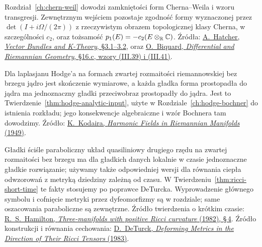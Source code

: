 \begin{description}[leftmargin=2.9cm,style=nextline]
\item[Normalizacja topologiczna Cherna--Weila.]
  Rozdział~\ref{ch:chern-weil} dowodzi zamkniętości
  form Cherna--Weila i wzoru transgresji. Zewnętrznym
  wejściem pozostaje zgodność formy wyznaczonej przez
  $\det(I+i\Omega/(2\pi))$ z rzeczywistym obrazem
  topologicznej klasy Cherna, w szczególności $c_2$,
  oraz tożsamość $p_1(E)=-c_2(E\otimes_{\mathbb{R}}\mathbb{C})$.
  Źródła:
  \href{https://pi.math.cornell.edu/~hatcher/VBKT/VB.pdf}
  {A.\ Hatcher, \emph{Vector Bundles and K-Theory},
  §3.1--3.2}, oraz
  \href{https://webusers.imj-prg.fr/~olivier.biquard/m2dg2022.pdf}
  {O.\ Biquard, \emph{Differential and Riemannian Geometry},
  §16.c, wzory (III.39) i (III.41)}.

\item[Analityczna teoria Hodge'a.]
  Dla laplasjanu Hodge'a na formach zwartej
  rozmaitości riemannowskiej bez brzegu
  jądro jest skończenie wymiarowe, a każda
  gładka forma prostopadła do jądra ma
  jednoznaczny gładki przeciwobraz
  prostopadły do jądra. Jest to
  Twierdzenie~\ref{thm:hodge-analytic-input},
  użyte w Rozdziale~\ref{ch:hodge-bochner}
  do istnienia rozkładu; jego konsekwencje
  algebraiczne i wzór Bochnera tam dowodzimy.
  Źródło:
  \href{https://doi.org/10.2307/1969552}
  {K.\ Kodaira, \emph{Harmonic Fields in
  Riemannian Manifolds} (1949)}.

\item[Analityczna teoria potoku Ricciego.]
  Gładki ściśle paraboliczny układ
  quasiliniowy drugiego rzędu na zwartej
  rozmaitości bez brzegu ma dla gładkich
  danych lokalnie w czasie jednoznaczne
  gładkie rozwiązanie; używamy także
  odpowiedniej wersji dla równania ciepła
  odwzorowań z metryką dziedziny zależną
  od czasu. W
  Twierdzeniu~\ref{thm:ricci-short-time}
  te fakty stosujemy po poprawce DeTurcka.
  Wyprowadzenie głównego symbolu i cofnięcie
  metryki przez dyfeomorfizmy są w rozdziale;
  same oszacowania paraboliczne są zewnętrzne.
  Źródło twierdzenia o krótkim czasie:
  \href{https://projecteuclid.org/journals/journal-of-differential-geometry/volume-17/issue-2/Three-manifolds-with-positive-Ricci-curvature/10.4310/jdg/1214436922.full}
  {R.\ S.\ Hamilton, \emph{Three-manifolds with
  positive Ricci curvature} (1982), \S\,4}.
  Źródło konstrukcji i równania cechowania:
  \href{https://projecteuclid.org/journals/journal-of-differential-geometry/volume-18/issue-1/Deforming-metrics-in-the-direction-of-their-Ricci-tensors/10.4310/jdg/1214509286.full}
  {D.\ DeTurck, \emph{Deforming Metrics in the
  Direction of Their Ricci Tensors} (1983)}.


\end{description}
